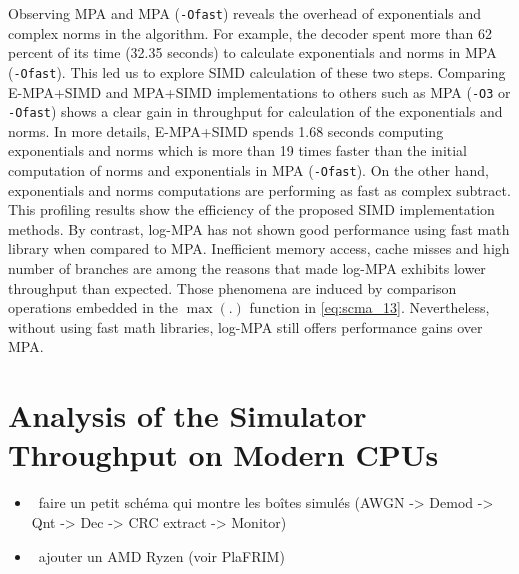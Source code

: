 Observing MPA and MPA (\verb|-Ofast|) reveals the overhead of exponentials and
complex norms in the algorithm. For example, the decoder spent more than 62
percent of its time (32.35 seconds) to calculate exponentials and norms in MPA
(\verb|-Ofast|). This led us to explore SIMD calculation of these two steps.
Comparing E-MPA+SIMD and MPA+SIMD implementations to others such as MPA
(\verb|-O3| or \verb|-Ofast|) shows a clear gain in throughput for calculation
of the exponentials and norms. In more details, E-MPA+SIMD spends 1.68 seconds
computing exponentials and norms which is more than 19 times faster than the
initial computation of norms and exponentials in MPA (\verb|-Ofast|). On the
other hand, exponentials and norms computations are performing as fast as
complex subtract. This profiling results show the efficiency of the proposed
SIMD implementation methods. By contrast, log-MPA has not shown good performance
using fast math library when compared to MPA. Inefficient memory access, cache
misses and high number of branches are among the reasons that made log-MPA
exhibits lower throughput than expected. Those phenomena are induced by
comparison operations embedded in the $\max(.)$ function in \eqref{eq:scma_13}.
Nevertheless, without using fast math libraries, log-MPA
still offers performance gains over MPA.

\section{Analysis of the Simulator Throughput on Modern CPUs}

\begin{itemize}
  \item \cmark~faire un petit schéma qui montre les boîtes simulés (AWGN -> Demod -> Qnt -> Dec -> CRC extract -> Monitor)
  \item \cmark~ajouter un AMD Ryzen (voir PlaFRIM)
\end{itemize}

